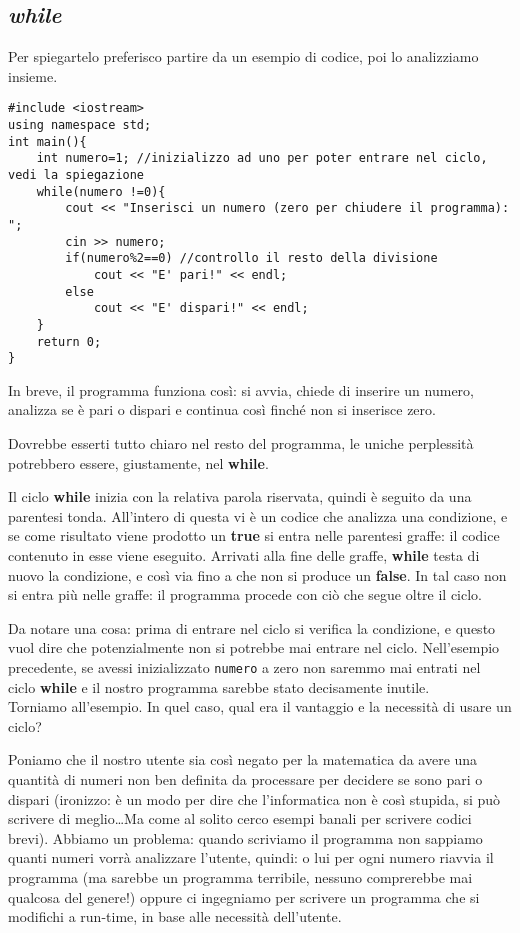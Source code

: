 	
	\subsection{\emph{while}}
	Per spiegartelo preferisco partire da un esempio di codice, poi lo analizziamo insieme.
	\begin{lstlisting}
#include <iostream>
using namespace std;
int main(){
	int numero=1; //inizializzo ad uno per poter entrare nel ciclo, vedi la spiegazione
	while(numero !=0){
		cout << "Inserisci un numero (zero per chiudere il programma): ";
		cin >> numero;
		if(numero%2==0) //controllo il resto della divisione
			cout << "E' pari!" << endl;
		else
			cout << "E' dispari!" << endl;
	}
	return 0;
}
	\end{lstlisting}
	In breve, il programma funziona così: si avvia, chiede di inserire un numero, analizza se è pari o dispari e continua così finché non si inserisce zero.
	
	Dovrebbe esserti tutto chiaro nel resto del programma, le uniche perplessità potrebbero essere, giustamente, nel \textbf{while}.
	
	Il ciclo \textbf{while} inizia con la relativa parola riservata, quindi è seguito da una parentesi tonda. All'intero di questa vi è un codice che analizza una condizione, e se come risultato viene prodotto un \textbf{true} si entra nelle parentesi graffe: il codice contenuto in esse viene eseguito. Arrivati alla fine delle graffe, \textbf{while} testa di nuovo la condizione, e così via fino a che non si produce un \textbf{false}. In tal caso non si entra più nelle graffe: il programma procede con ciò che segue oltre il ciclo.
	
	Da notare una cosa: prima di entrare nel ciclo si verifica la condizione, e questo vuol dire che potenzialmente non si potrebbe mai entrare nel ciclo. Nell'esempio precedente, se avessi inizializzato \verb|numero| a zero non saremmo mai entrati nel ciclo \textbf{while} e il nostro programma sarebbe stato decisamente inutile.\\
	
	Torniamo all'esempio. In quel caso, qual era il vantaggio e la necessità di usare un ciclo?
	
	Poniamo che il nostro utente sia così negato per la matematica da avere una quantità di numeri non ben definita da processare per decidere se sono pari o dispari (ironizzo: è un modo per dire che l'informatica non è così stupida, si può scrivere di meglio\ldots Ma come al solito cerco esempi banali per scrivere codici brevi). Abbiamo un problema: quando scriviamo il programma non sappiamo quanti numeri vorrà analizzare l'utente, quindi: o lui per ogni numero riavvia il programma (ma sarebbe un programma terribile, nessuno comprerebbe mai qualcosa del genere!) oppure ci ingegniamo per scrivere un programma che si modifichi a run-time, in base alle necessità dell'utente. 
	
